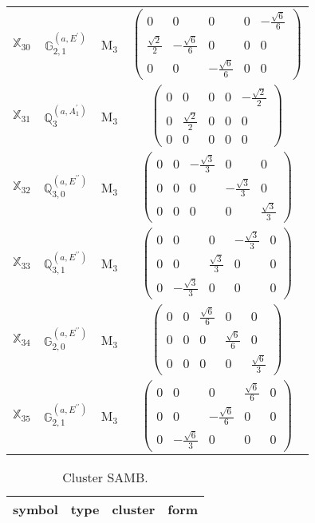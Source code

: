 \documentclass[fleqn,10pt,landscape]{article}
\begin{document}
\begin{itemize}
\begin{center}
\begin{longtable}{c|c|c|c}
$ \mathbb{X}_{30} $ & $\mathbb{G}_{2,1}^{(a,E^{\prime})}$ & M$_{3}$ & $\begin{pmatrix} 0 & 0 & 0 & 0 & - \frac{\sqrt{6}}{6} \\ \frac{\sqrt{2}}{2} & - \frac{\sqrt{6}}{6} & 0 & 0 & 0 \\ 0 & 0 & - \frac{\sqrt{6}}{6} & 0 & 0 \end{pmatrix}$ \\
$ \mathbb{X}_{31} $ & $\mathbb{Q}_{3}^{(a,A_{1}^{\prime})}$ & M$_{3}$ & $\begin{pmatrix} 0 & 0 & 0 & 0 & - \frac{\sqrt{2}}{2} \\ 0 & \frac{\sqrt{2}}{2} & 0 & 0 & 0 \\ 0 & 0 & 0 & 0 & 0 \end{pmatrix}$ \\
$ \mathbb{X}_{32} $ & $\mathbb{Q}_{3,0}^{(a,E^{\prime\prime})}$ & M$_{3}$ & $\begin{pmatrix} 0 & 0 & - \frac{\sqrt{3}}{3} & 0 & 0 \\ 0 & 0 & 0 & - \frac{\sqrt{3}}{3} & 0 \\ 0 & 0 & 0 & 0 & \frac{\sqrt{3}}{3} \end{pmatrix}$ \\
$ \mathbb{X}_{33} $ & $\mathbb{Q}_{3,1}^{(a,E^{\prime\prime})}$ & M$_{3}$ & $\begin{pmatrix} 0 & 0 & 0 & - \frac{\sqrt{3}}{3} & 0 \\ 0 & 0 & \frac{\sqrt{3}}{3} & 0 & 0 \\ 0 & - \frac{\sqrt{3}}{3} & 0 & 0 & 0 \end{pmatrix}$ \\
$ \mathbb{X}_{34} $ & $\mathbb{G}_{2,0}^{(a,E^{\prime\prime})}$ & M$_{3}$ & $\begin{pmatrix} 0 & 0 & \frac{\sqrt{6}}{6} & 0 & 0 \\ 0 & 0 & 0 & \frac{\sqrt{6}}{6} & 0 \\ 0 & 0 & 0 & 0 & \frac{\sqrt{6}}{3} \end{pmatrix}$ \\
$ \mathbb{X}_{35} $ & $\mathbb{G}_{2,1}^{(a,E^{\prime\prime})}$ & M$_{3}$ & $\begin{pmatrix} 0 & 0 & 0 & \frac{\sqrt{6}}{6} & 0 \\ 0 & 0 & - \frac{\sqrt{6}}{6} & 0 & 0 \\ 0 & - \frac{\sqrt{6}}{3} & 0 & 0 & 0 \end{pmatrix}$ \\
\end{longtable}
\end{center}
\begin{center}
\renewcommand{\arraystretch}{1.3}
\begin{longtable}{c|c|c|c}
\caption{Cluster SAMB.}
 \\
 \hline \hline
symbol & type & cluster & form \\ \hline \endfirsthead


\end{longtable}
\end{center}
\end{itemize}
\end{document}
